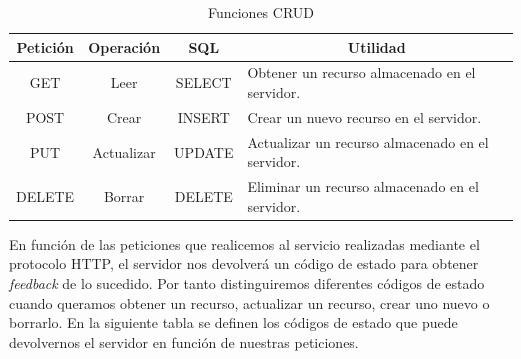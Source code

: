 \begin{table}[H]
\begin{tabular}{|c|c|c|m{6.25cm}|}
\hline
{\bf Petición} & {\bf Operación} & {\bf SQL} & \multicolumn{1}{c|}{{\bf Utilidad}}              \\ \hline
GET            & Leer            & SELECT    & Obtener un recurso almacenado en el servidor.    \\ \hline
POST           & Crear           & INSERT    & Crear un nuevo recurso en el servidor.           \\ \hline
PUT            & Actualizar      & UPDATE    & Actualizar un recurso almacenado en el servidor. \\ \hline
DELETE         & Borrar          & DELETE    & Eliminar un recurso almacenado en el servidor.   \\ \hline
\end{tabular}
\caption{Funciones CRUD}
\label{fig:CRUDtable}
\end{table}

En función de las peticiones que realicemos al servicio realizadas mediante el protocolo HTTP, el servidor nos devolverá un código de estado para obtener \textit{feedback} de lo sucedido. Por tanto distinguiremos diferentes códigos de estado cuando queramos obtener un recurso, actualizar un recurso, crear uno nuevo o borrarlo. En la siguiente tabla se definen los códigos de estado que puede devolvernos el servidor en función de nuestras peticiones.

